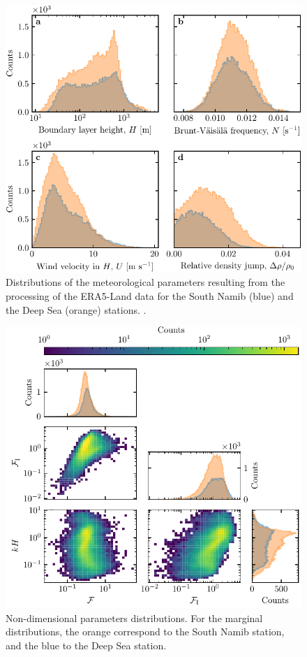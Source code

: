 \begin{figure}[p]
\centering
\includegraphics{Figures/Figure10_supp.pdf}
\caption{Distributions of the meteorological parameters resulting from the processing of the ERA5-Land data for the South Namib (blue) and the Deep Sea (orange) stations. . }
\label{Fig10_supp}
\end{figure}

\begin{figure}[p]
\centering
\includegraphics[scale=1]{Figures/Figure11_supp.pdf}
\caption{Non-dimensional parameters distributions. For the marginal  distributions, the orange correspond to the South Namib station, and the blue to the Deep Sea station.}
\label{Fig11_supp}
\end{figure}

